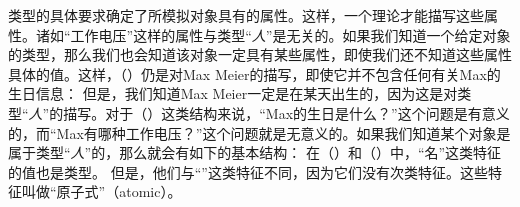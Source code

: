 类型的具体要求确定了所模拟对象具有的属性。这样，一个理论才能描写这些属性。诸如“\textsc{工作电压}”这样的属性与类型“\textit{人}”是无关的。如果我们知道一个给定对象的类型，那么我们也会知道该对象一定具有某些属性，即使我们还不知道这些属性具体的值。这样，（）仍是对Max Meier的描写，即使它并不包含任何有关Max的生日信息：
\ea
{}
\z
但是，我们知道Max Meier一定是在某天出生的，因为这是对类型“\textit{人}”的描写。对于（）这类结构来说，“Max的生日是什么？”这个问题是有意义的，而“Max有哪种工作电压？”这个问题就是无意义的。如果我们知道某个对象是属于类型“\textit{人}”的，那么就会有如下的基本结构：
\ea
{}
\z
在（）和（）中，“\textsc{名}”这类特征的值也是类型。
但是，他们与“”这类特征不同，因为它们没有次类特征。这些特征叫做“原子式”（atomic）。


